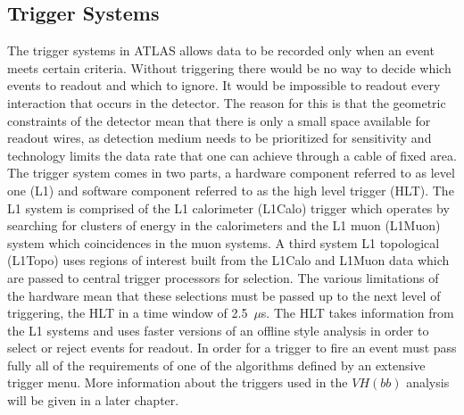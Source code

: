\subsection{Trigger Systems}%
\label{sec:trigger}

The trigger systems in ATLAS allows data to be recorded only when an event meets
certain criteria. Without triggering there would be no way to decide which
events to readout and which to ignore. It would be impossible to readout every
interaction that occurs in the detector. The reason for this is that the
geometric constraints of the detector mean that there is only a small space
available for readout wires, as detection medium needs to be prioritized for
sensitivity and technology limits the data rate that one can achieve through a
cable of fixed area. The trigger system comes in two parts, a hardware component
referred to as level one (L1) and software component referred to as the high
level trigger (HLT). The L1 system is comprised of the L1 calorimeter (L1Calo)
trigger which operates by searching for clusters of energy in the calorimeters
and the L1 muon (L1Muon) system which coincidences in the muon systems. A third
system L1 topological (L1Topo) uses regions of interest built from the L1Calo
and L1Muon data which are passed to central trigger processors for selection.
The various limitations of the hardware mean that these selections must be
passed up to the next level of triggering, the HLT in a time window of
2.5~$\mu$s. The HLT takes information from the L1 systems and uses faster
versions of an offline style analysis in order to select or reject events for
readout. In order for a  trigger to fire an event must pass fully all of the
requirements of one of the algorithms defined by an extensive trigger menu. More
information about the triggers used in the $VH(bb)$ analysis will be given in a
later chapter.
